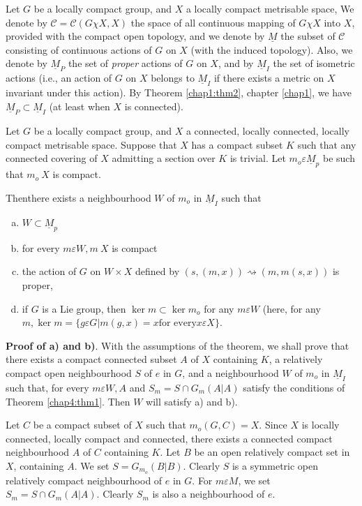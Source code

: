 Let $G$ be a locally compact group, and $X$ a locally compact
metrisable space, We denote by $\mathscr{C}= \mathscr{C}(G \chi X,X)$
the space of all continuous mapping of $G \chi X$ into $X$, provided
with the compact open topology, and we denote by $\underline{M}$ the
subset of $\mathscr{C}$ consisting of continuous actions of $G$
on $X$ (with the induced topology). Also, we denote by
$\underline{M}_P$ the set of  \textit{proper} actions of $G$ on $X$,
and by $\underline{M}_I$ the set of isometric actions (i.e., an action
of $G$ on $X$ belongs to $\underline{M}_I$ if there exists a metric on
$X$ invariant under this action). By Theorem \ref{chap1:thm2}, chapter
\ref{chap1}, we have 
$\underline{M}_P \subset \underline{M}_I$ (at least when $X$ is
connected). 

\begin{thm}\label{chap4:thm2}%
  Let $G$ be a locally compact group, and $X$ a connected, locally
  connected, locally compact metrisable space. Suppose that $X$ has a
  compact subset $K$ such that any connected covering of $X$ admitting a
  section over $K$ is trivial. Let $m_o \varepsilon \underline{M}_p$ be
  such that $m_o \  X$ is compact.   
\end{thm}

Then\pageoriginale there exists a neighbourhood $W$ of $m_o$ in $\underline{M}_I$
such that  
\begin{enumerate}[a)]
\item $W \subset \underline{M}_p$
\item for every $m \varepsilon W,  m \ X$ is compact
\item the action of $G$ on $W \times X$ defined by $(s, (m,x))
  \rightsquigarrow (m,m(s,x))$ is proper, 
\item if $G$ is a Lie group, then $\ker m \subset\ker m_o$ for any $m
  \varepsilon W$ (here, for any $m, \ker m = \bigg\{ g \varepsilon G |
  m (g,x) = x \text{for every} x \varepsilon X \bigg\}$. 
\end{enumerate}

\medskip
\noindent \textbf{Proof of a) and b)}. With the assumptions of the
theorem, we shall 
  prove that there exists a compact connected subset $A$ of $X$
  containing $K$, a relatively compact open neighbourhood $S$ of $e$
  in $G$, and a neighbourhood $W$ of $m_o$ in $\underline{M}_I$ such
  that, for every $m \varepsilon W, A$ and $S_m= S \cap G_m (A|A)$
  satisfy the conditions of Theorem \ref{chap4:thm1}. Then $W$ will satisfy a)
  and b). 

Let $C$ be a compact subset of $X$ such that $m_o (G,C)= X$. Since $X$
is locally connected, locally compact and connected, there exists a
connected compact neighbourhood $A$ of $C$ containing $K$. Let $B$
be an open relatively compact set in $X$, containing $A$. We set $S =
G_{m{_o}} (B|B)$. Clearly $S$ is a symmetric open relatively compact
neighbourhood of $e$ in $G$. For $m \varepsilon M$, we set $S _m = S
\cap G_m (A|A)$. Clearly $S_m$ is also a neighbourhood of $e$.   

